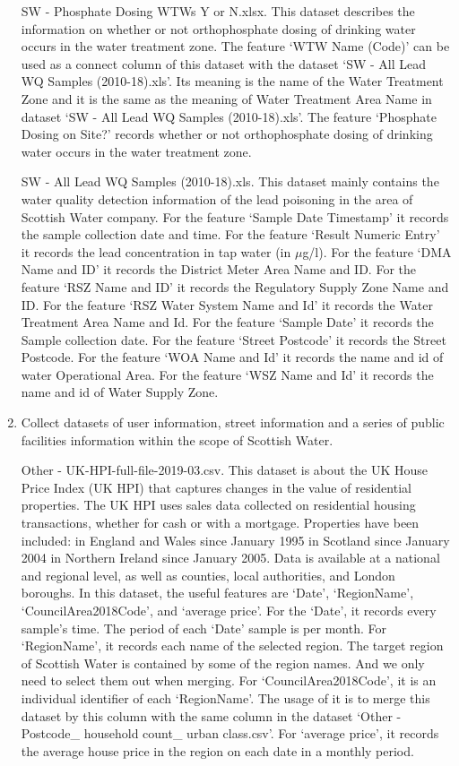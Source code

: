 \documentclass[11pt,twoside]{article}
\numberwithin{Theorem}{section}
\numberwithin{Definition}{section}
\numberwithin{Lemma}{section}
\numberwithin{Algorithm}{section}
\numberwithin{equation}{section}
\begin{document}
\begin{enumerate}
SW - Phosphate Dosing WTWs Y or N.xlsx. This dataset describes the information on whether or not orthophosphate dosing of drinking water occurs in the water treatment zone. The feature ‘WTW Name (Code)’ can be used as a connect column of this dataset with the dataset ‘SW - All Lead WQ Samples (2010-18).xls’. Its meaning is the name of the Water Treatment Zone and it is the same as the meaning of Water Treatment Area Name in dataset ‘SW - All Lead WQ Samples (2010-18).xls’. The feature ‘Phosphate Dosing on Site?’ records whether or not orthophosphate dosing of drinking water occurs in the water treatment zone.

SW - All Lead WQ Samples (2010-18).xls. This dataset mainly contains the water quality detection information of the lead poisoning in the area of Scottish Water company. For the feature ‘Sample Date Timestamp’ it records the sample collection date and time. For the feature ‘Result Numeric Entry’ it records the lead concentration in tap water (in $\mu$g/l). For the feature ‘DMA Name and ID’ it records the District Meter Area Name and ID. For the feature ‘RSZ Name and ID’ it records the Regulatory Supply Zone Name and ID. For the feature ‘RSZ Water System Name and Id’ it records the Water Treatment Area Name and Id. For the feature ‘Sample Date’ it records the Sample collection date. For the feature ‘Street Postcode’ it records the Street Postcode. For the feature ‘WOA Name and Id’ it records the name and id of water Operational Area. For the feature ‘WSZ Name and Id’ it records the name and id of Water Supply Zone.

\item Collect datasets of user information, street information and a series of public facilities information within the scope of Scottish Water.

Other - UK-HPI-full-file-2019-03.csv. This dataset is about the UK House Price Index (UK HPI) that captures changes in the value of residential properties. The UK HPI uses sales data collected on residential housing transactions, whether for cash or with a mortgage. Properties have been included: in England and Wales since January 1995 in Scotland since January 2004 in Northern Ireland since January 2005. Data is available at a national and regional level, as well as counties, local authorities, and London boroughs. In this dataset, the useful features are ‘Date’, ‘RegionName’, ‘CouncilArea2018Code’, and ‘average price’. For the ‘Date’, it records every sample’s time. The period of each ‘Date’ sample is per month. For ‘RegionName’, it records each name of the selected region. The target region of Scottish Water is contained by some of the region names. And we only need to select them out when merging. For ‘CouncilArea2018Code’, it is an individual identifier of each ‘RegionName’. The usage of it is to merge this dataset by this column with the same column in the dataset ‘Other - Postcode\_ household count\_ urban class.csv’. For ‘average price’, it records the average house price in the region on each date in a monthly period.


\end{enumerate}
\end{document}
